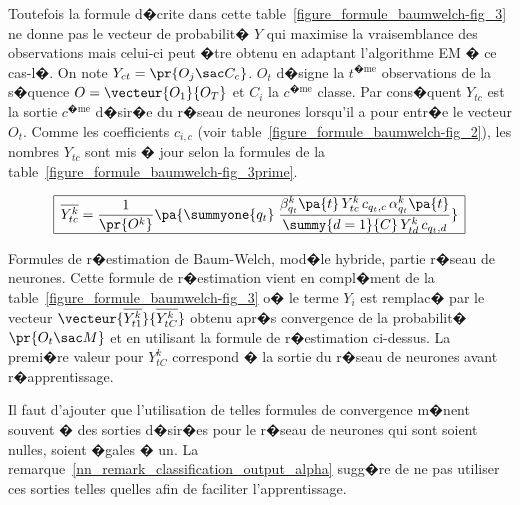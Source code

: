 Toutefois la formule d�crite dans cette table~\ref{figure_formule_baumwelch-fig_3} ne donne pas le vecteur de probabilit� $Y$ qui maximise la vraisemblance des observations mais celui-ci peut �tre obtenu en adaptant l'algorithme EM � ce cas-l�. On note $Y_{ct} = \pr{ O_j \sac C_c }$. $O_t$ d�signe la $t^\text{�me}$ observations de la s�quence $O = \vecteur{O_1}{O_T}$ et $C_i$ la $c^\text{�me}$ classe. Par cons�quent $Y_{tc}$ est la sortie $c^\text{�me}$ d�sir�e du r�seau de neurones lorsqu'il a pour entr�e le vecteur $O_t$. Comme les coefficients $c_{i,c}$ (voir table~\ref{figure_formule_baumwelch-fig_2}), les nombres $Y_{tc}$ sont mis � jour selon la formules de la table~\ref{figure_formule_baumwelch-fig_3prime}. 


                \begin{table}[t]
                $$\begin{array}{|l|}\hline
                \overline{Y_{tc}^k} = \dfrac{1}{ \pr{O^k} } \pa { 
                                    \summyone{q_t} \; 
                                            \dfrac{  \beta_{q_t}^k\pa{t} \, Y_{tc}^k  \, c_{q_t,c} \, \alpha_{q_t}^k \pa{t} }
                                                    {  \summy{d=1}{C} \, Y_{td}^k  \,  c_{q_t,d} }
                                                    }
                \\ \hline
                \end{array}$$
                \caption{    Formules de r�estimation de Baum-Welch, mod�le hybride, partie r�seau de neurones.
                                    Cette formule de r�estimation vient en compl�ment de la
                                    table~\ref{figure_formule_baumwelch-fig_3} o� le terme $Y_i$ est remplac� par le 
                                    vecteur $\vecteur{ \overline{Y_{t1}^k} }{ \overline{Y_{tC}^k} } $ obtenu apr�s convergence
                                    de la probabilit� $\pr{ O_t \sac M}$ et en utilisant la formule 
                                    de r�estimation ci-dessus. La premi�re valeur pour $Y_{tC}^k$ correspond � la sortie
                                    du r�seau de neurones avant r�apprentissage. }
                \label{figure_formule_baumwelch-fig_3prime}
                \end{table}

Il faut d'ajouter que l'utilisation de telles formules de convergence m�nent souvent � des sorties d�sir�es pour le r�seau de neurones qui sont soient nulles, soient �gales � un. La remarque~\ref{nn_remark_classification_output_alpha} sugg�re de ne pas utiliser ces sorties telles quelles afin de faciliter l'apprentissage.


